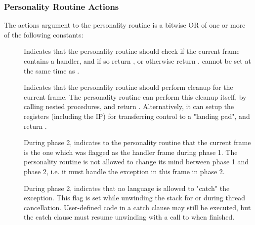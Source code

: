 \subsubsection{Personality Routine Actions}

The actions argument to the personality routine is a bitwise OR of one or
more of the following constants: \\

\begin{description}
\item[] Indicates that the personality routine should
   check if the current frame contains a handler, and if so return
   , or otherwise return .
    cannot be set at the same time as .

\item[] Indicates that the personality routine should
   perform cleanup for the current frame. The personality routine can perform
   this cleanup itself, by calling nested procedures, and return
   . Alternatively, it can setup the registers
   (including the IP) for transferring control to a "landing pad", and
   return .

\item[]
   During phase 2, indicates to the personality routine that the current
   frame is the one which was flagged as the handler frame during phase 1.
   The personality routine is not allowed to change its mind between phase 1
   and phase 2, i.e. it must handle the exception in this frame in phase 2.

\item[] During phase 2, indicates that no language is
   allowed to "catch" the exception. This flag is set while unwinding the
   stack for  or during thread cancellation. User-defined code in a
   catch clause may still be executed, but the catch clause must resume
   unwinding with a call to  when finished.
\end{description}

